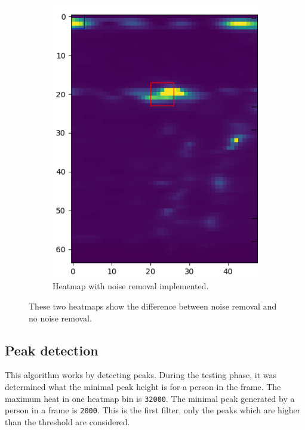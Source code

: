 \begin{figure}[t]
\begin{subfigure}{.45\textwidth}
  \includegraphics[width=.9\linewidth]{figures/people_detection/heatmap_with_filtering_crop.png}  
  \caption{Heatmap with noise removal implemented.}
  \label{fig:noise_removal}
\end{subfigure}
\caption{These two heatmaps show the difference between noise removal and no noise removal.}
\label{fig:noise_vs_no_noise}
\end{figure}

\subsection{Peak detection}
This algorithm works by detecting peaks. During the testing phase, it was determined what the minimal peak height is for a person in the frame. The maximum heat in one heatmap bin is \texttt{32000}. The minimal peak generated by a person in a frame is \texttt{2000}. This is the first filter, only the peaks which are higher than the threshold are considered.

